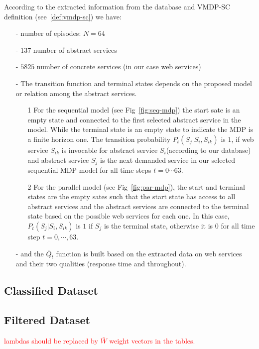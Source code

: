 \documentclass[10pt,journal,compsoc]{IEEEtran}
\newcommand{\red}[1]{\textcolor{red}{#1}}
\begin{document}
According to the extracted information from the database and VMDP-SC definition (see~\ref{def:vmdp-sc}) we have:
\begin{itemize}
\item[-] number of episodes:  $N=64$
\item[-] $137$ number of abstract services 
\item[-] $5825$ number of concrete services (in our case web services)
\item[-]  The transition function and terminal states depends on the proposed model or relation among the abstract services. 
\begin{itemize}

\item[1] For the sequential model (see Fig~\ref{fig:seq-mdp}) the start sate is an empty state and connected to the first selected abstract service in the model. While the terminal state is an empty state to indicate the MDP is a finite horizon one. The transition probability $P_t(S_j | S_i, S_{ik})$ is $1$, if web service $S_{ik}$ is invocable for abstract service $S_{i}$(according to our database) and abstract service $S_j$ is the next demanded service in our selected sequential MDP model for all time steps $t=0 \cdots 63$. 

\item[2] For the parallel model (see Fig~\ref{fig:par-mdp}), the start and terminal states are the empty sates such that the start state has access to all abstract services and the abstract services are connected to the terminal state based on the possible web services for each one. In this case, $P_t(S_j | S_i, S_{ik})$ is $1$ if $S_j$ is the terminal state, otherwise it is $0$ for all time step $t = 0, \cdots, 63$. 
\end{itemize}

\item[-] and the $\overline{Q}_t$ function is built based on the extracted data on web services and their two qualities (response time and throughout).
\end{itemize}

\subsection{Classified Dataset}

\subsection{Filtered Dataset}
\red{lambdas should be replaced by $\bar{W}$ weight vectors in the tables.}
\end{document}
